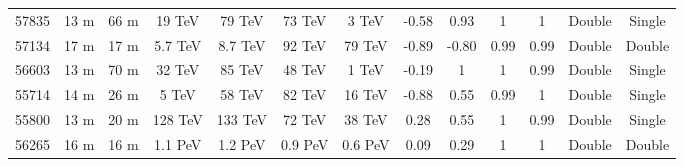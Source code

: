 \begin{table}[h!]
\begin{tabular}{c|cc|cc|cc|cc|cc|cc}
        \midrule
        57835   &   13 m   & \cellcolor{lightgray}66 m    & 19 TeV   &   \cellcolor{lightgray}79 TeV  &   73 TeV  &   \cellcolor{lightgray}3 TeV  &   -0.58  &   \cellcolor{lightgray}0.93 & 1 &  \cellcolor{lightgray}1&Double& \cellcolor{lightgray}Single\\
        57134   &   17 m   & \cellcolor{lightgray}17 m    & 5.7 TeV   &   \cellcolor{lightgray}8.7 TeV  &   92 TeV  &   \cellcolor{lightgray}79 TeV  &   -0.89  &   \cellcolor{lightgray}-0.80 & 0.99 &  \cellcolor{lightgray}0.99&Double& \cellcolor{lightgray}Double\\
        56603   & 13 m   & \cellcolor{lightgray}70 m    & 32 TeV   &   \cellcolor{lightgray}85 TeV  &    48 TeV  &   \cellcolor{lightgray}1 TeV  &   -0.19  &   \cellcolor{lightgray}1 & 1 &  \cellcolor{lightgray}0.99 & Double & \cellcolor{lightgray}Single\\
        55714   &   14 m   & \cellcolor{lightgray}26 m    & 5 TeV   &   \cellcolor{lightgray}58 TeV  &   82 TeV  &   \cellcolor{lightgray}16 TeV  &   -0.88  &   \cellcolor{lightgray}0.55 & 0.99 &  \cellcolor{lightgray}1&Double& \cellcolor{lightgray}Single\\
        55800   &   13 m   & \cellcolor{lightgray}20 m    & 128 TeV   &   \cellcolor{lightgray}133 TeV  &   72 TeV  &   \cellcolor{lightgray}38 TeV  &   0.28  &   \cellcolor{lightgray}0.55 & 1 &  \cellcolor{lightgray}0.99&Double& \cellcolor{lightgray}Single\\
        56265   &  16 m   & \cellcolor{lightgray}16 m    & 1.1 PeV   &   \cellcolor{lightgray}1.2 PeV  &   0.9 PeV  &   \cellcolor{lightgray}0.6 PeV  &   0.09  &   \cellcolor{lightgray}0.29 & 1 &  \cellcolor{lightgray}1&Double& \cellcolor{lightgray}Double\\
            \bottomrule
    \end{tabular}
\end{table}


